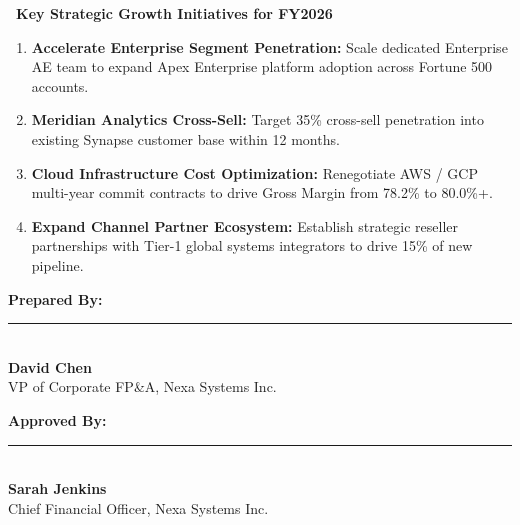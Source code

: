 \documentclass[10pt,a4paper]{article}
\begin{document}
\vspace{12pt}

\begin{tcolorbox}[calloutbox]
  \noindent\textbf{\color{NavyPrimary}\faCheckCircle\ Key Strategic Growth Initiatives for FY2026}
  \begin{enumerate}[label=\arabic*., leftmargin=*, topsep=2pt, itemsep=2pt]
    \item \textbf{Accelerate Enterprise Segment Penetration:} Scale dedicated Enterprise AE team to expand Apex Enterprise platform adoption across Fortune 500 accounts.
    \item \textbf{Meridian Analytics Cross-Sell:} Target 35\% cross-sell penetration into existing Synapse customer base within 12 months.
    \item \textbf{Cloud Infrastructure Cost Optimization:} Renegotiate AWS / GCP multi-year commit contracts to drive Gross Margin from 78.2\% to 80.0\%+.
    \item \textbf{Expand Channel Partner Ecosystem:} Establish strategic reseller partnerships with Tier-1 global systems integrators to drive 15\% of new pipeline.
  \end{enumerate}
\end{tcolorbox}

\vspace{10pt}

\noindent
\begin{minipage}[t]{0.48\textwidth}
  \small
  \textbf{Prepared By:}\\[14pt]
  \rule{0.8\textwidth}{0.4pt}\\[4pt]
  \textbf{David Chen}\\
  VP of Corporate FP\&A, Nexa Systems Inc.
\end{minipage}%
\hfill
\begin{minipage}[t]{0.48\textwidth}
  \small
  \textbf{Approved By:}\\[14pt]
  \rule{0.8\textwidth}{0.4pt}\\[4pt]
  \textbf{Sarah Jenkins}\\
  Chief Financial Officer, Nexa Systems Inc.
\end{minipage}
\end{document}
